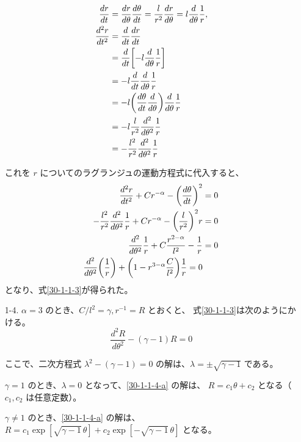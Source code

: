\documentclass[report]{dennou777}
\begin{document}
\begin{itemize}
		\begin{align*}
			\frac{dr}{dt}&=\frac{dr}{d\theta}\frac{d\theta}{dt}
				=\frac{l}{r^2}\frac{dr}{d\theta}
				=l\frac{d}{d\theta}\frac{1}{r},\\
			\frac{d^2r}{dt^2}&=\frac{d}{dt}\frac{dr}{dt}\\
			&=\frac{d}{dt}\mleft[-l\frac{d}{d\theta}\frac{1}{r}\mright]\\
			&=-l\frac{d}{dt}\frac{d}{d\theta}\frac{1}{r}\\
			&=-l\mleft(\frac{d\theta}{dt}\frac{d}{d\theta}\mright)\frac{d}{d\theta}\frac{1}{r}\\
			&=-l\frac{l}{r^2}\frac{d^2}{d\theta^2}\frac{1}{r}\\
			&=-\frac{l^2}{r^2}\frac{d^2}{d\theta^2}\frac{1}{r}
		\end{align*}

		これを $r$ についてのラグランジュの運動方程式に代入すると、
		\begin{align*}
			\frac{d^2r}{dt^2}+Cr^{-\alpha}-\mleft(\frac{d\theta}{dt}\mright)^2&=0\\
			-\frac{l^2}{r^2}\frac{d^2}{d\theta^2}\frac{1}{r}+Cr^{-\alpha}
				-\mleft(\frac{l}{r^2}\mright)^2r&=0\\
			\frac{d^2}{d\theta^2}\frac{1}{r}+C\frac{r^{2-\alpha}}{l^2}-\frac{1}{r}&=0\\
			\frac{d^2}{d\theta^2}\mleft(\frac{1}{r}\mright)+
				\mleft(1-r^{3-\alpha}\frac{C}{l^2}\mright)\frac{1}{r}=0
		\end{align*}
		となり、式\eqref{30-1-1-3}が得られた。
	\item[1-4.]
		$\alpha=3$ のとき、$C/l^2=\gamma, r^{-1}=R$ とおくと、
		式\eqref{30-1-1-3}は次のようにかける。
		\begin{equation}
			\frac{d^2R}{d\theta^2}-(\gamma-1)R=0\label{30-1-1-4-a}
		\end{equation}

		ここで、二次方程式 $\lambda^2-(\gamma-1)=0$ の解は、$\lambda=\pm\sqrt{\gamma-1}$
		である。

		$\gamma=1$ のとき、$\lambda=0$ となって、\eqref{30-1-1-4-a} の解は、
		$R=c_1\theta+c_2$ となる（$c_1, c_2$ は任意定数）。

		$\gamma\neq1$ のとき、\eqref{30-1-1-4-a} の解は、
		$R=c_1\exp[\sqrt{\gamma-1}\,\theta]+c_2\exp[-\sqrt{\gamma-1}\,\theta]$
		となる。


\end{itemize}
\end{document}
